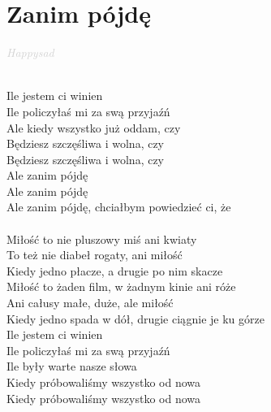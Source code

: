 \documentclass[a5paper, 10pt]{book}
\begin{document}
\section{Zanim pójdę}\textcolor{lightgray}{\textit{Happysad}}\\~\\
\begin{minipage}[t]{0.8\textwidth}
  Ile jestem ci winien\\
  Ile policzyłaś mi za swą przyjaźń\\
  Ale kiedy wszystko już oddam, czy\\
  Będziesz szczęśliwa i wolna, czy\\
  Będziesz szczęśliwa i wolna, czy\\

  \hspace*{5mm}Ale zanim pójdę\\
  \hspace*{5mm}Ale zanim pójdę\\
  \hspace*{5mm}Ale zanim pójdę, chciałbym powiedzieć ci, że\\
  \hspace*{5mm}\\
  \hspace*{5mm}Miłość to nie pluszowy miś ani kwiaty\\
  \hspace*{5mm}To też nie diabeł rogaty, ani miłość\\
  \hspace*{5mm}Kiedy jedno płacze, a drugie po nim skacze\\
  \hspace*{5mm}Miłość to żaden film, w żadnym kinie ani róże\\
  \hspace*{5mm}Ani całusy małe, duże, ale miłość\\
  \hspace*{5mm}Kiedy jedno spada w dół, drugie ciągnie je ku górze\\

  Ile jestem ci winien\\
  Ile policzyłaś mi za swą przyjaźń\\
  Ile były warte nasze słowa\\
  Kiedy próbowaliśmy wszystko od nowa\\
  Kiedy próbowaliśmy wszystko od nowa\\
\end{minipage}
\end{document}
